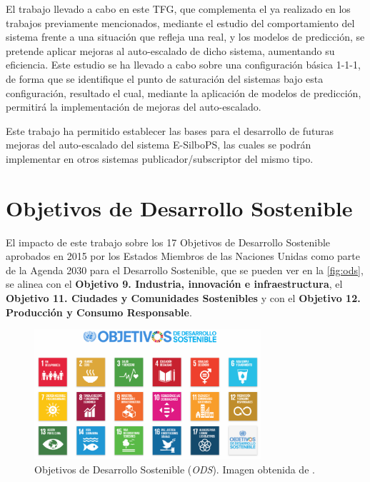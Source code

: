 El trabajo llevado a cabo en este TFG, que complementa el ya realizado en los 
trabajos previamente mencionados, mediante el estudio del comportamiento del
sistema frente a una situación que refleja una real, y los modelos de 
predicción, se pretende aplicar mejoras al auto-escalado de dicho sistema, 
aumentando su eficiencia. Este estudio se ha llevado a cabo sobre una
configuración básica 1-1-1, de forma que se identifique el punto de saturación
del sistemas bajo esta configuración, resultado el cual, mediante la aplicación
de modelos de predicción, permitirá la implementación de mejoras del auto-escalado.

Este trabajo ha permitido establecer las bases para el desarrollo de futuras 
mejoras del auto-escalado del sistema E-SilboPS, las cuales se podrán 
implementar en otros sistemas publicador/subscriptor del mismo tipo.


\section{Objetivos de Desarrollo Sostenible} \label{sct:impacto_ods}


El impacto de este trabajo sobre los 17 Objetivos de Desarrollo Sostenible 
aprobados en 2015 por los Estados Miembros de las Naciones Unidas como parte
de la Agenda 2030 para el Desarrollo Sostenible\cite{web:agenda2030}, que se 
pueden ver en la \autoref{fig:ods}, se alinea con
el \textbf{Objetivo 9. Industria, innovación e infraestructura},
el \textbf{Objetivo 11. Ciudades y Comunidades Sostenibles} y 
con el \textbf{Objetivo 12. Producción y Consumo Responsable}.

\begin{figure}[htpb]
    \centering
    \includegraphics[width=0.75\textwidth]{images/ODS.png}
    \caption{Objetivos de Desarrollo Sostenible (\textit{ODS}). Imagen obtenida de \cite{web:agenda2030}.}
    \label{fig:ods}
\end{figure}

